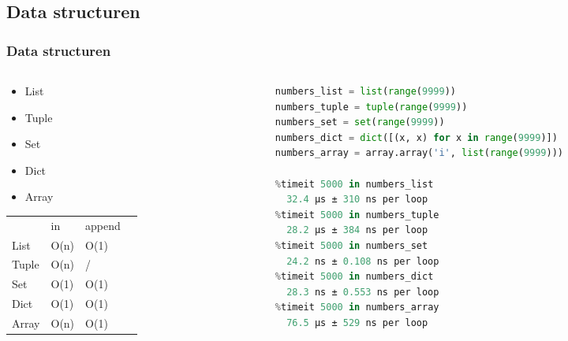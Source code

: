 \documentclass[aspectratio=169]{beamer}
\begin{document}
\subsection{Data structuren}
\begin{frame}[fragile]
  \frametitle{Data structuren}
  \begin{columns}
    \begin{column}{0.3\textwidth}
      \begin{itemize}
        \item List
        \item Tuple
        \item Set
        \item Dict
        \item Array
      \end{itemize}
      \medskip
      \begin{table}[]
        \begin{tabular}{llll}
              & in   & append \\
        List  & O(n) & O(1)  \\
        Tuple & O(n) &  /    \\
        Set   & O(1) & O(1)  \\
        Dict  & O(1) & O(1)  \\
        Array & O(n) & O(1)
        \end{tabular}
      \end{table}
    \end{column}
    \begin{column}{0.7\textwidth}
      \begin{lstlisting}[language=Python, basicstyle=\small]
numbers_list = list(range(9999))
numbers_tuple = tuple(range(9999))
numbers_set = set(range(9999))
numbers_dict = dict([(x, x) for x in range(9999)])
numbers_array = array.array('i', list(range(9999)))

%timeit 5000 in numbers_list
  32.4 µs ± 310 ns per loop
%timeit 5000 in numbers_tuple
  28.2 µs ± 384 ns per loop
%timeit 5000 in numbers_set
  24.2 ns ± 0.108 ns per loop
%timeit 5000 in numbers_dict
  28.3 ns ± 0.553 ns per loop
%timeit 5000 in numbers_array
  76.5 µs ± 529 ns per loop
      \end{lstlisting}
    \end{column}
  \end{columns}
\end{frame}

\end{document}
